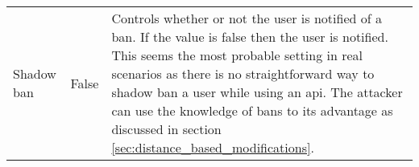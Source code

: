 \begin{longtable}{p{3cm}p{2.5cm}p{7cm}}
Shadow ban &False &Controls whether or not the user is notified of a ban. If the value is false then the user is notified. This seems the most probable setting in real scenarios as there is no straightforward way to shadow ban a user while using an \gls{api}. The attacker can use the knowledge of bans to its advantage as discussed in section \ref{sec:distance_based_modifications}.\\
\end{longtable}